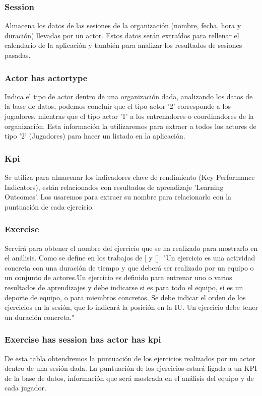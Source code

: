 \subsubsection{Session}
Almacena los datos de las sesiones de la organización (nombre, fecha, hora y duración) llevadas por un actor. Estos datos serán extraídos para rellenar el calendario de la aplicación y también para analizar los resultados de sesiones pasadas.
\subsubsection{Actor has actortype}
Indica el tipo de actor dentro de una organización dada, analizando los datos de la base de datos, podemos concluir que el tipo actor '2' corresponde a los jugadores, mientras que el tipo actor '1' a los entrenadores o coordinadores de la organización. Esta información la utilizaremos para extraer a todos los actores de tipo '2' (Jugadores) para hacer un listado en la aplicación.
\subsubsection{Kpi}
Se utiliza para almacenar los indicadores clave de rendimiento (Key Performance Indicators), están relacionados con resultados de aprendizaje 'Learning Outcomes'. Los usaremos para extraer su nombre para relacionarlo con la puntuación de cada ejercicio.
\subsubsection{Exercise}
Servirá para obtener el nombre del ejercicio que se ha realizado para mostrarlo en el análisis. Como se define en los trabajos de [\cite{TFG_Daniel} y [\cite{TFG_Sergio}]: "Un ejercicio es una actividad concreta con una duración de tiempo y que deberá ser realizado por un equipo o un conjunto de actores.Un ejercicio es definido para entrenar uno o varios resultados de aprendizajes y debe indicarse si es para todo el equipo, si es un deporte de equipo, o para miembros concretos. Se debe indicar el orden de los ejercicios en la sesión, que lo indicará la posición en la IU. Un ejercicio debe tener un duración concreta."
\subsubsection{Exercise has session has actor has kpi}
De esta tabla obtendremos la puntuación de los ejercicios realizados por un actor dentro de una sesión dada. La puntuación de los ejercicios estará ligada a un KPI de la base de datos, información que será mostrada en el análisis del equipo y de cada jugador.

